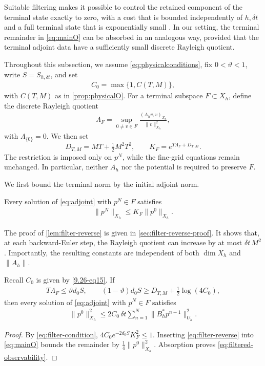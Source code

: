 \documentclass[print,wide,eng]{draft}
\begin{document}
Suitable filtering makes it possible to control the retained component of the terminal state exactly to zero, with a cost that is bounded independently of $h,\delta t$ and a full terminal state that is exponentially small \cite{Zuazua2005}. In our setting, the terminal remainder in \cref{eq:mainO} can be absorbed in an analogous way, provided that the terminal adjoint data have a sufficiently small discrete Rayleigh quotient.

Throughout this subsection, we assume \cref{eq:physicalconditions}, fix $0<\vartheta<1$, write $S=S_{h,\delta t}$, and set
%
\begin{align}\label{9.26-eq15}
C_0=\max\{1,C(T,M)\},
\end{align}
%
with $C(T,M)$ as in \cref{prop:physicalO}. For a terminal subspace $F\subset X_h$, define the discrete Rayleigh quotient\vspace{-2mm}
%
\begin{align}\label{eq:filter-rayleigh}
\Lambda_F=\sup_{0\ne v\in F}\frac{(A_hv,v)_{X_h}}{\|v\|_{X_h}^2},
\end{align}
%
with $\Lambda_{\{0\}}=0$. We then set\vspace{-2mm}
$$
D_{T,M}=MT+\tfrac12M^2T^2,
\qquad
K_F=e^{T\Lambda_F+D_{T,M}}.
$$
The restriction is imposed only on $p^N$, while the fine-grid equations remain unchanged. In particular, neither $A_h$ nor the potential is required to preserve $F$.



We first bound the terminal norm by the initial adjoint norm.
%
\begin{lemma}\label{lem:filter-reverse}
Every solution of \cref{eq:adjoint} with $p^N\in F$ satisfies
%
\begin{align}\label{eq:filter-reverse}
\|p^N\|_{X_h}\leq K_F\|p^0\|_{X_h}.
\end{align}
%
\end{lemma}
%
The proof of \cref{lem:filter-reverse} is given in \cref{sec:filter-reverse-proof}.
It shows that, at each backward-Euler step, the Rayleigh quotient can increase by at most $\delta t\,M^2$. Importantly, the resulting constants are independent of both $\dim X_h$ and $\|A_h\|$.

%
\begin{theorem}\label{thm:filtered-observability}
Recall $C_0$ is given by \cref{9.26-eq15}. If
%
\begin{align}\label{eq:filter-condition}
T\Lambda_F\leq\vartheta d_0S,
\qquad (1-\vartheta)d_0S\geq D_{T,M}+\tfrac12\log(4C_0),
\end{align}
%
then every solution of \cref{eq:adjoint} with $p^N\in F$ satisfies
%
\begin{align}\label{eq:filtered-observability}
\|p^0\|_{X_h}^2
\leq2C_0\,\delta t\sum_{n=1}^N\|B_h^*p^{n-1}\|_{U_h}^2.
\end{align}
%
\end{theorem}
%
\begin{proof}
By \cref{eq:filter-condition}, $4C_0e^{-2d_0S}K_F^2\leq1$. Inserting \cref{eq:filter-reverse} into \cref{eq:mainO} bounds the remainder by $\tfrac14\|p^0\|_{X_h}^2$. Absorption proves \cref{eq:filtered-observability}.
\end{proof}
%
\end{document}
